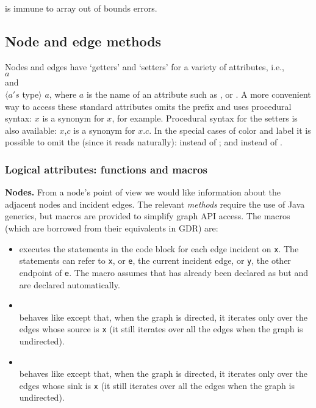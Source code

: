is immune to array out of bounds errors.

\subsection{Node and edge methods}

Nodes and edges have `getters' and `setters' for
a variety of attributes, i.e.,
\\
$a$
\\
and
\\
$\langle a's$ type$\rangle$ $a$\Code{()},
where $a$ is the name of an attribute such as
,
 or .
A more convenient way to access these standard attributes omits the prefix 
and uses procedural syntax:
$x$\Code{)} is a synonym for $x$, for example.
Procedural syntax for the setters is also available:
$x$,$c$\Code{)} is a synonym for $x$.$c$\Code{)}.
In the special cases of color and label it is possible to omit the 
(since it reads naturally):
 instead of
;
and
 instead of
.

\subsubsection{Logical attributes: functions and macros}

\textbf{Nodes.} From a node's point of view we would like information about
 the adjacent nodes and incident edges.  The relevant \emph{methods} require
 the use of Java generics, but macros are provided to simplify graph API
 access. The macros (which are borrowed from their equivalents in GDR) are:

\begin{itemize}

\item
{}
executes the statements in the code block for each edge incident on \verb$x$.
The statements can refer to \verb$x$, or \verb$e$, the current incident edge,
or \verb$y$, the other endpoint of \verb$e$.
The macro assumes that  has already been declared as 
but  and  are declared automatically.

\item
{}\\
behaves like  except that, when the graph is directed,
it iterates only over the edges whose source is \verb$x$ (it still iterates over all the edges when the graph is undirected). 

\item
{}\\
behaves like  except that, when the graph is directed,
it iterates only over the edges whose sink is \verb$x$ (it still iterates over all the edges when the graph is undirected). 

\end{itemize}

